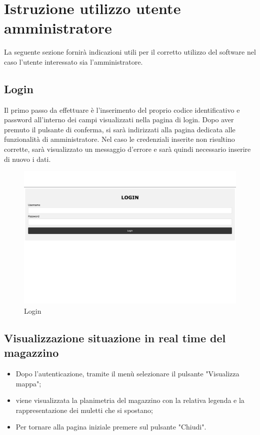 \section{Istruzione utilizzo utente amministratore}

La seguente sezione fornirà indicazioni utili per il corretto utilizzo del software nel caso l'utente interessato sia l'amministratore.

\subsection{Login}
Il primo passo da effettuare è l'inserimento del proprio codice identificativo e password all'interno dei campi visualizzati nella pagina di login. Dopo aver premuto il pulsante di conferma, si sarà indirizzati alla pagina dedicata alle funzionalità di amministratore. Nel caso le credenziali inserite non risultino corrette, sarà visualizzato un messaggio d'errore e sarà quindi necessario inserire di nuovo i dati.
\begin{figure}[H]
    \centering
    \includegraphics[scale=0.12]{res/images/login.png}
    \caption{Login}
\end{figure}
\subsection{Visualizzazione situazione in real time del magazzino}
\begin{itemize}
    \item Dopo l'autenticazione, tramite il menù selezionare il pulsante "Visualizza mappa";
    \item viene visualizzata la planimetria del magazzino con la relativa legenda e la rappresentazione dei muletti che si spostano;
    \item Per tornare alla pagina iniziale premere sul pulsante "Chiudi".
\end{itemize}

